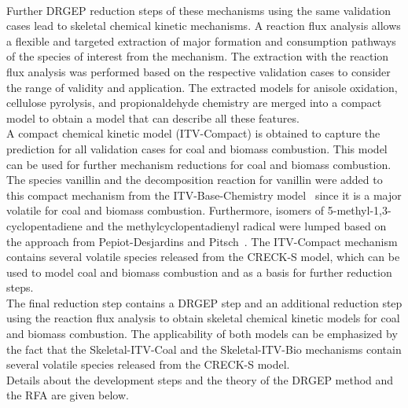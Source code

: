 \begin{refsection}
\begin{figure}[h]
  \label{fig:B1bKineticModelDevelopmentStructure}
\end{figure}
\\
Further DRGEP reduction steps of these mechanisms using the same validation cases lead to skeletal chemical kinetic mechanisms. A reaction flux analysis allows a flexible and targeted extraction of major formation and consumption pathways of the species of interest from the mechanism. The extraction with the reaction flux analysis was performed based on the respective validation cases to consider the range of validity and application. The extracted models for anisole oxidation, cellulose pyrolysis, and propionaldehyde chemistry are merged into a compact model to obtain a model that can describe all these features.
\\
A compact chemical kinetic model (ITV-Compact) is obtained to capture the prediction for all validation cases for coal and biomass combustion. This model can be used for further mechanism reductions for coal and biomass combustion. The species vanillin and the decomposition reaction for vanillin were added to this compact mechanism from the ITV-Base-Chemistry model~\cite{Langer2023} since it is a major volatile for coal and biomass combustion. Furthermore, isomers of 5-methyl-1,3-cyclopentadiene and the methylcyclopentadienyl radical were lumped based on the approach from Pepiot-Desjardins and Pitsch~\cite{PepiotDesjardins2008b}. The ITV-Compact mechanism contains several volatile species released from the CRECK-S model, which can be used to model coal and biomass combustion and as a basis for further reduction steps.
\\
The final reduction step contains a DRGEP step and an additional reduction step using the reaction flux analysis to obtain skeletal chemical kinetic models for coal and biomass combustion. The applicability of both models can be emphasized by the fact that the Skeletal-ITV-Coal and the Skeletal-ITV-Bio mechanisms contain several volatile species released from the CRECK-S model.
\\
Details about the development steps and the theory of the DRGEP method and the RFA are given below.
 
 

\end{refsection}
